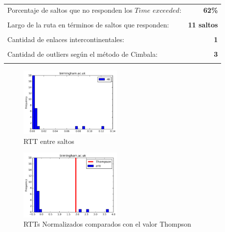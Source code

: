 \begin{center}
\begin{tabular}{p{6.5cm}r}
Porcentaje de saltos que no responden los $Time$ $exceeded$: & \textbf{62\%} \\ \\ 
Largo de la ruta en términos de saltos que responden: &\textbf{11 saltos} \\ \\
Cantidad de enlaces intercontinentales: & \textbf{1} \\ \\
Cantidad de outliers según el método de Cimbala: & \textbf{3} \\ \\
\end{tabular}
\end{center}

\begin{figure}[H]
  \centering
    \includegraphics[width=0.45\textwidth]{histogramas_rtt/birmingham-ac-uk.png}
  \caption{RTT entre saltos}
  \label{entropia-s}
\end{figure}

\begin{center}

\end{center}

\begin{figure}[H]
  \centering
    \includegraphics[width=0.45\textwidth]{histogramas_thompson/birmingham-ac-uk.png}
  \caption{RTTs Normalizados comparados con el valor Thompson}
  \label{entropia-s}
\end{figure}

